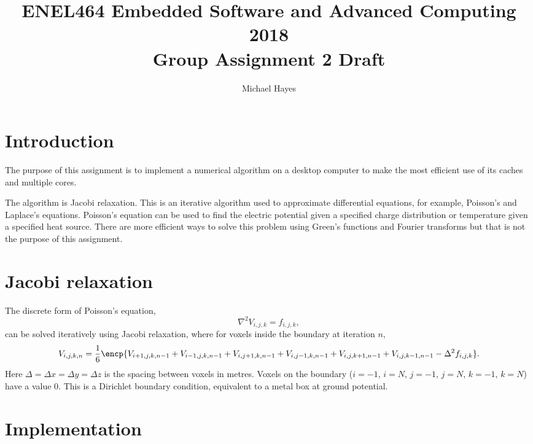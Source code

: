 \documentclass[a4paper,11pt]{article}
\begin{document}
\title{ \bf ENEL464 Embedded Software and Advanced Computing 2018 \\ Group Assignment 2 Draft}
\author{Michael Hayes}
\maketitle


\section{Introduction}

The purpose of this assignment is to implement a numerical algorithm
on a desktop computer to make the most efficient use of its caches and
multiple cores.

The algorithm is Jacobi relaxation.  This is an iterative algorithm
used to approximate differential equations, for example, Poisson's and
Laplace's equations.  Poisson's equation can be used to find the
electric potential given a specified charge distribution or
temperature given a specified heat source.  There are more efficient
ways to solve this problem using Green's functions and Fourier
transforms but that is not the purpose of this assignment.

\section{Jacobi relaxation}

The discrete form of Poisson's equation,
%
\begin{equation}
  \nabla^2 V_{i,j,k} = f_{i,j,k},
\end{equation}
%
can be solved iteratively using Jacobi relaxation, where for voxels
inside the boundary at iteration $n$,
%
\begin{equation}
  V_{i,j,k,n} = \frac{1}{6}\encp{V_{i+1,j,k,n-1} + V_{i-1,j,k,n-1} + V_{i,j+1,k,n-1} + V_{i,j-1,k,n-1} + V_{i,j,k+1,n-1} + V_{i,j,k-1,n-1} - \Delta^2 f_{i,j,k}}.
\label{eqn:Jacobi}
\end{equation}
%
Here $\Delta = \Delta x = \Delta y = \Delta z$ is the spacing between
voxels in metres.  Voxels on the boundary ($i = -1$, $i=N$, $j = -1$,
$j=N$, $k = -1$, $k=N$) have a value 0.  This is a Dirichlet boundary
condition, equivalent to a metal box at ground potential.


\section{Implementation}
\end{document}
